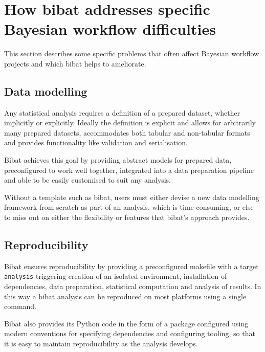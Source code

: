 \documentclass[
  letterpaper,
  DIV=11,
  numbers=noendperiod]{scrartcl}
\begin{document}
\hypertarget{how-bibat-addresses-specific-bayesian-workflow-difficulties}{%
\section{How bibat addresses specific Bayesian workflow
difficulties}\label{how-bibat-addresses-specific-bayesian-workflow-difficulties}}

This section describes some specific problems that often affect Bayesian
workflow projects and which bibat helps to ameliorate.

\hypertarget{data-modelling}{%
\subsection{Data modelling}\label{data-modelling}}

Any statistical analysis requires a definition of a prepared dataset,
whether implicitly or explicitly. Ideally the definition is explicit and
allows for arbitrarily many prepared datasets, accommodates both tabular
and non-tabular formats and provides functionality like validation and
serialisation.

Bibat achieves this goal by providing abstract models for prepared data,
preconfigured to work well together, integrated into a data preparation
pipeline and able to be easily customised to suit any analysis.

Without a template such as bibat, users must either devise a new data
modelling framework from scratch as part of an analysis, which is
time-consuming, or else to miss out on either the flexibility or
features that bibat's approach provides.

\hypertarget{reproducibility}{%
\subsection{Reproducibility}\label{reproducibility}}

Bibat ensures reproducibility by providing a preconfigured makefile with
a target \texttt{analysis} triggering creation of an isolated
environment, installation of dependencies, data preparation, statistical
computation and analysis of results. In this way a bibat analysis can be
reproduced on most platforms using a single command.

Bibat also provides its Python code in the form of a package configured
using modern conventions for specifying dependencies and configuring
tooling, so that it is easy to maintain reproducibility as the analysis
develops.
\end{document}
